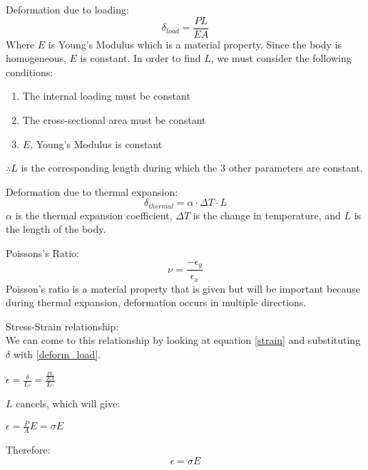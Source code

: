 \documentclass[12pt]{article}
\begin{document}
Deformation due to loading:
\begin{equation} \label{deform_load}
\delta_{load} = \frac{PL}{EA}
\end{equation}
Where $E$ is Young's Modulus which is a material property. Since the body is homogeneous, $E$ is constant. In order to find $L$, we must consider the following conditions:
\begin{enumerate}
	\item The internal loading must be constant
	\item The cross-sectional area must be constant
	\item $E$, Young's Modulus is constant
\end{enumerate}
$\therefore L$ is the corresponding length during which the 3 other parameters are constant.
\newline

Deformation due to thermal expansion:
\begin{equation} \label{deform_thermal}
\delta_{thermal} = \alpha \cdot \Delta T \cdot L
\end{equation}
$\alpha$ is the thermal expansion coefficient, $\Delta T$ is the change in temperature, and $L$ is the length of the body.
\pagebreak

Poissons's Ratio:
\begin{equation} \label{poisson}
\nu=\frac{-\epsilon_{y}}{\epsilon_{x}}
\end{equation}
Poisson's ratio is a material property that is given but will be important because during thermal expansion, deformation occurs in multiple directions.
\newline

Stress-Strain relationship:\\
We can come to this relationship by looking at equation \ref{strain} and substituting $\delta$ with \ref{deform_load}.
\newline
\begin{center}
$\epsilon = \frac{\delta}{L_{º}} = \frac{\frac{PL}{EA}}{L_{º}}$
\end{center}
$L$ cancels, which will give:
\newline
\begin{center}
$\epsilon = \frac{P}{A}E = \sigma E$
\end{center}
Therefore:
\begin{equation} \label{stress_strain}
\epsilon = \sigma E
\end{equation}
\end{document}
